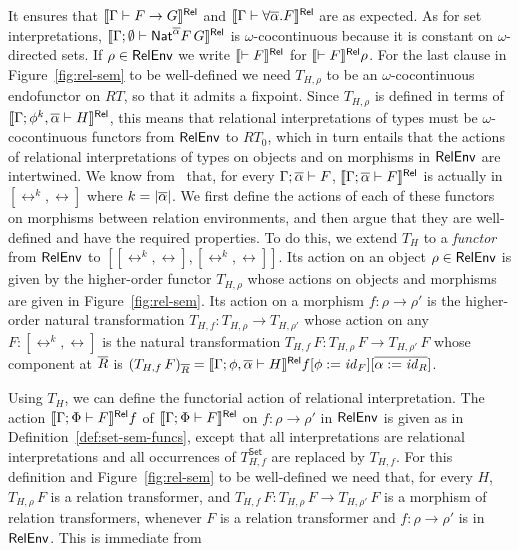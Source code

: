 \documentclass[runningheads]{llncs}
\newcommand{\set}{\mathsf{Set}}
\renewcommand{\id}{\mathit{id}}
\renewcommand{\id}{\mathit{id}}
\begin{document}
It ensures that $\llbracket{\Gamma \vdash F \to G}\rrbracket^{\mathsf{Rel}}$ and $\llbracket{\Gamma
  \vdash \forall \overline{\alpha}. F}\rrbracket^{\mathsf{Rel}}$ are as expected.  As for set
interpretations, $\llbracket{\Gamma; \emptyset \vdash \mathsf{Nat}^{\overline{\alpha}}
  F\,G}\rrbracket^{\mathsf{Rel}}$ is $\omega$-cocontinuous because it is constant on
$\omega$-directed sets.  If $\rho \in \mathsf{RelEnv}$ we write
$\llbracket{\vdash F}\rrbracket^{\mathsf{Rel}}$ for $\llbracket{\vdash F}\rrbracket^{\mathsf{Rel}}\rho$.  For the last clause
in Figure~\ref{fig:rel-sem} to be well-defined we need $T_{H,\rho}$ to
be an $\omega$-cocontinuous endofunctor on $RT$, so that it admits a
fixpoint. Since $T_{H,\rho}$ is defined in terms of
$\llbracket{\Gamma;\phi^k, \overline{\alpha} \vdash H}\rrbracket^{\mathsf{Rel}}$, this means that
relational interpretations of types must be $\omega$-cocontinuous
functors from $\mathsf{RelEnv}$ to $RT_0$, which in turn entails that the
actions of relational interpretations of types on objects and on
morphisms in $\mathsf{RelEnv}$ are intertwined.  We know from~\cite{jp19}
that, for every $\Gamma; \overline{\alpha} \vdash F$, $\llbracket{\Gamma;
  \overline{\alpha} \vdash F}\rrbracket^{\mathsf{Rel}}$ is actually in $[\rel^k,\rel]$ where $k =
|\overline{\alpha}|$.  We first define the actions of each of these functors
on morphisms between relation environments, and then argue that they
are well-defined and have the required properties. To do this, we
extend $T_H$ to a {\em functor} from $\mathsf{RelEnv}$ to
$[[\rel^k,\rel],[\rel^k,\rel]]$. Its action on an object $\rho \in
\mathsf{RelEnv}$ is given by the higher-order functor $T_{H,\rho}$ whose
actions on objects and morphisms are given in
Figure~\ref{fig:rel-sem}. Its action on a morphism $f : \rho \to
\rho'$ is the higher-order natural transformation $T_{H,f} :
T_{H,\rho} \to T_{H,\rho'}$ whose action on any $F : [\rel^k,\rel]$ is
the natural transformation $T_{H,f}\, F : T_{H,\rho}\, F \to
T_{H,\rho'}\, F$ whose component at $\overline{R}$ is $(T_{H,f}\,
F)_{\ol{R}} = \relsem{\Gamma; \phi,\ol{\alpha} \vdash H}f[\phi :=
  \id_F][\ol{\alpha := \id_R}]$.

Using $T_H$, we can define the functorial action of relational
interpretation.  The action $\llbracket{\Gamma;\Phi \vdash F}\rrbracket^{\mathsf{Rel}} f$ of
$\llbracket{\Gamma;\Phi \vdash F}\rrbracket^{\mathsf{Rel}}$ on $f : \rho \to \rho'$ in $\mathsf{RelEnv}$
is given as in Definition~\ref{def:set-sem-funcs}, except that all
interpretations are relational interpretations and all occurrences of
$T^\set_{H,f}$ are replaced by $T_{H,f}$.  For this definition and
Figure~\ref{fig:rel-sem} to be well-defined we need that, for every
$H$, $T_{H,\rho}\,F$ is a relation transformer, and $T_{H,f}\, F :
T_{H,\rho}\, F \to T_{H,\rho'}\, F$ is a morphism of relation
transformers, whenever $F$ is a relation transformer and $f : \rho \to
\rho'$ is in $\mathsf{RelEnv}$. This is immediate from
\end{document}
